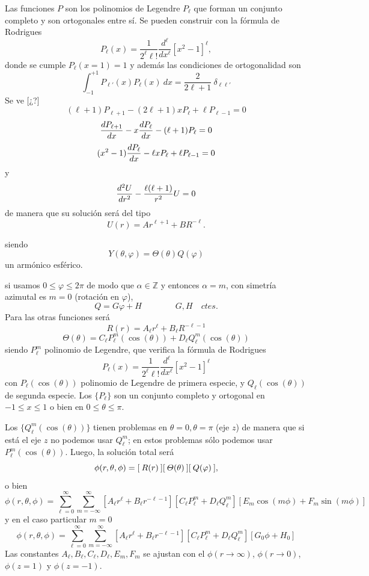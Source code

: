 \documentclass[10pt,oneside]{CBFT_book}
\begin{document}
Las funciones $P$ son los polinomios de Legendre $P_\ell$ que forman un conjunto completo y son ortogonales
entre sí. Se pueden construir con la fórmula de Rodrigues
\[
	P_\ell (x) = \frac{1}{2^\ell \ell!} \frac{d^\ell}{d x^\ell} [x^2 - 1]^\ell, 
\]
donde se cumple $P_\ell(x=1) = 1$ y además las condiciones de ortogonalidad son
\[
	\int_{-1}^{+1} P_{\ell'}(x) P_\ell (x) \: dx= \frac{2}{2\ell + 1} \: \delta_{\ell\ell'}
\]
Se ve [¿?]
\[
	(\ell+1) P_{\ell+1} - (2\ell+1) x P_{\ell} + \ell P_{\ell-1} = 0
\]
\[
	\dtot{P_{\ell+1}}{x} - x \dtot{P_{\ell}}{x} - (\ell+1) P_{\ell} = 0
\]
\[
	(x^2-1) \dtot{P_{\ell}}{x} - \ell x P_{\ell} + \ell P_{\ell-1} = 0
\]
y
\[
	\dtot[2]{U}{r} - \frac{\ell(\ell+1)}{r^2} U = 0
\]
de manera que su solución será del tipo
\[
	U(r) = A r^{\ell+1} + B R^{-\ell}.
\]

siendo
\[
	Y(\theta,\varphi) = \Theta(\theta) Q(\varphi)
\]
un armónico esférico.


si usamos $0\leq \varphi \leq 2\pi$ de modo que $\alpha\in\mathbb{Z}$ y entonces $\alpha=m$, con simetría
azimutal es $m=0$ (rotación en $\varphi$), 
\[
	Q = G\varphi + H \qquad\qquad  G,H \quad ctes.
\]
Para las otras funciones será
\[
	R(r) = A_\ell r^\ell + B_\ell R^{-\ell-1}
\]
\[
	\Theta(\theta) = C_\ell P_\ell^m (\cos(\theta)) + D_\ell Q_\ell^m (\cos(\theta))
\]
siendo $P_\ell^m$ polinomio de Legendre, que verifica la fórmula de Rodrigues
\[
	P_\ell (x) = \frac{1}{2^\ell \ell!} \frac{d^\ell}{d x^\ell} [x^2 - 1]^\ell
\]
con $P_\ell(\cos(\theta))$ polinomio de Legendre de primera especie, y $Q_\ell(\cos(\theta))$ de segunda
especie.
Los $\{ P_\ell\}$ son un conjunto completo y ortogonal en $-1 \leq x \leq 1$ o bien en $0\leq \theta\leq \pi$.

Los $\{ Q_\ell^m(\cos(\theta))\}$ tienen problemas en $\theta=0,\theta=\pi$ (eje $z$) de manera que si está el
eje $z$ no podemos usar $Q_\ell^m$; en estos problemas sólo podemos usar $P_\ell^m(\cos(\theta))$.
Luego, la solución total será
\[
	\phi(r,\theta,\phi) = [ \: R(r) \: ] [ \: \Theta(\theta) \: ] [ \: Q(\vp) \: ],
\]
o bien
\[
	\phi(r,\theta,\phi) = \sum_{\ell=0}^{\infty}\sum_{m=-\infty}^{\infty} \left[ A_\ell r^\ell + 
	B_\ell r^{-\ell-1} \right] \left[ C_\ell P_\ell^m + D_\ell Q_\ell^m \right] \left[ E_m \cos(m\phi) + 
	F_m \sin(m\phi) \right]
\]
y en el caso particular $m=0$
\[
	\phi(r,\theta,\phi) = \sum_{\ell=0}^{\infty}\sum_{m=-\infty}^{\infty} \left[ A_\ell r^\ell + 
	B_\ell r^{-\ell-1} \right] \left[ C_\ell P_\ell^m + D_\ell Q_\ell^m \right] \left[ G_0 \phi + 
	H_0 \right]	
\]
Las constantes $A_\ell, B_\ell, C_\ell, D_\ell, E_m, F_m$ se ajustan con el $\phi (r\to\infty)$, 
$\phi (r\to 0)$, $\phi (z = 1)$ y $\phi (z = -1)$.
\end{document}
